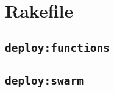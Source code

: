 \appendix
\appendixpage
\addappheadtotoc

\section{Rakefile}

\subsection{\texttt{deploy:functions}}


\newpage
\subsection{\texttt{deploy:swarm}}

